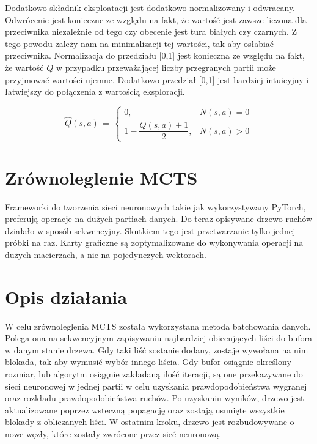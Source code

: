 \hspace{2cm}

Dodatkowo składnik eksploatacji jest dodatkowo normalizowany i odwracany. Odwrócenie jest konieczne ze względu na fakt, że wartość jest zawsze liczona dla przeciwnika niezależnie od tego czy obecenie jest tura białych czy czarnych. Z tego powodu zależy nam na minimalizacji tej wartości, tak aby osłabiać przeciwnika. Normalizacja do przedziału [0,1] jest konieczna ze względu na fakt, że wartość $Q$ w przypadku przeważającej liczby przegranych partii może przyjmować wartości ujemne. Dodatkowo przedział [0,1] jest bardziej intuicyjny i łatwiejszy do połączenia z wartością eksploracji.

\begin{equation}
\widehat{Q}(s,a) \,=\,
\begin{cases}
0, & N(s,a) = 0 \\
1 - \dfrac{Q(s,a) + 1}{2}, & N(s,a) > 0
\end{cases}
\end{equation}

\section*{Zrównoleglenie MCTS}
Frameworki do tworzenia sieci neuronowych takie jak wykorzystywany PyTorch, preferują operacje na dużych partiach danych. Do teraz opisywane drzewo ruchów działało w sposób sekwencyjny. Skutkiem tego jest przetwarzanie tylko jednej próbki na raz. Karty graficzne są zoptymalizowane do wykonywania operacji na dużych macierzach, a nie na pojedynczych wektorach.

\section*{Opis działania}
W celu zrównoleglenia MCTS została wykorzystana metoda batchowania danych. Polega ona na sekwencyjnym zapisywaniu najbardziej obiecujących liści do bufora w danym stanie drzewa. Gdy taki liść zostanie dodany, zostaje wywołana na nim blokada, tak aby wymusić wybór innego liścia. Gdy bufor osiągnie określony rozmiar, lub algorytm osiągnie zakładaną ilość iteracji, są one przekazywane do sieci neuronowej w jednej partii w celu uzyskania prawdopodobieństwa wygranej oraz rozkładu prawdopodobieństwa ruchów. Po uzyskaniu wyników, drzewo jest aktualizowane poprzez wsteczną popagację oraz zostają usunięte wszystkie blokady z obliczanych liści. W ostatnim kroku, drzewo jest rozbudowywane o nowe węzły, które zostały zwrócone przez sieć neuronową.

